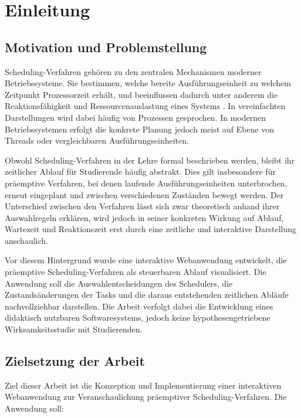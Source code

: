 \chapter{Einleitung}

\section{Motivation und Problemstellung}

Scheduling-Verfahren gehören zu den zentralen Mechanismen moderner Betriebssysteme. Sie bestimmen, welche bereite Ausführungseinheit zu welchem Zeitpunkt Prozessorzeit erhält, und beeinflussen dadurch unter anderem die Reaktionsfähigkeit und Ressourcenauslastung eines Systems \cite{stallings_betriebssysteme,tanenbaum_moderne_betriebssysteme_de}. In vereinfachten Darstellungen wird dabei häufig von Prozessen gesprochen. In modernen Betriebssystemen erfolgt die konkrete Planung jedoch meist auf Ebene von Threads oder vergleichbaren Ausführungseinheiten.

Obwohl Scheduling-Verfahren in der Lehre formal beschrieben werden, bleibt ihr zeitlicher Ablauf für Studierende häufig abstrakt. Dies gilt insbesondere für präemptive Verfahren, bei denen laufende Ausführungseinheiten unterbrochen, erneut eingeplant und zwischen verschiedenen Zuständen bewegt werden. Der Unterschied zwischen den Verfahren lässt sich zwar theoretisch anhand ihrer Auswahlregeln erklären, wird jedoch in seiner konkreten Wirkung auf Ablauf, Wartezeit und Reaktionszeit erst durch eine zeitliche und interaktive Darstellung anschaulich.

Vor diesem Hintergrund wurde eine interaktive Webanwendung entwickelt, die präemptive Scheduling-Verfahren als steuerbaren Ablauf visualisiert. Die Anwendung soll die Auswahlentscheidungen des Schedulers, die Zustandsänderungen der Tasks und die daraus entstehenden zeitlichen Abläufe nachvollziehbar darstellen. Die Arbeit verfolgt dabei die Entwicklung eines didaktisch nutzbaren Softwaresystems, jedoch keine hypothesengetriebene Wirksamkeitsstudie mit Studierenden.

\section{Zielsetzung der Arbeit}

Ziel dieser Arbeit ist die Konzeption und Implementierung einer interaktiven Webanwendung zur Veranschaulichung präemptiver Scheduling-Verfahren. Die Anwendung soll:

